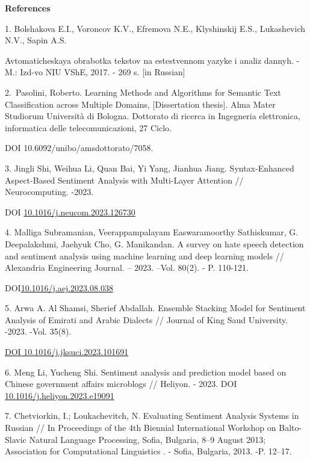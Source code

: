 \begin{center}
{\bfseries References}
\end{center}

\begin{references}
1. Bolshakova E.I., Voroncov K.V., Efremova N.E., Klyshinskij E.S.,
Lukashevich N.V., Sapin A.S. 

Avtomaticheskaya obrabotka tekstov na
estestvennom yazyke i analiz dannyh. - M.: Izd-vo NIU VShE, 2017. - 269
s. {[}in Russian{]}

2.~Pasolini, Roberto. Learning Methods and Algorithms for Semantic Text
Classification across Multiple Domains, {[}Dissertation thesis{]}. Alma
Mater Studiorum Università di Bologna. Dottorato di ricerca in
Ingegneria elettronica, informatica delle telecomunicazioni, 27 Ciclo.

DOI 10.6092/unibo/amsdottorato/7058.

3. Jingli Shi, Weihua Li, Quan Bai, Yi Yang, Jianhua Jiang.
Syntax-Enhanced Aspect-Based Sentiment Analysis with Multi-Layer
Attention // Neurocomputing. -2023.

DOI
\href{https://doi.org/10.1016/j.neucom.2023.126730}{10.1016/j.neucom.2023.126730}

4. Malliga Subramanian, Veerappampalayam Easwaramoorthy Sathiskumar, G.
Deepalakshmi, Jaehyuk Cho, G. Manikandan. A survey on hate speech
detection and sentiment analysis using machine learning and deep
learning models // Alexandria Engineering Journal. -- 2023. --Vol.
80(2). - P. 110-121.

DOI\href{http://dx.doi.org/10.1016/j.aej.2023.08.038}{10.1016/j.aej.2023.08.038}

5. Arwa A. Al Shamsi, Sherief Abdallah. Ensemble Stacking Model for
Sentiment Analysis of Emirati and Arabic Dialects // Journal of King
Saud University. -2023. -Vol. 35(8).

\href{https://doi.org/10.1016/j.jksuci.2023.101691}{DOI
10.1016/j.jksuci.2023.101691}

6. Meng Li, Yucheng Shi. Sentiment analysis and prediction model based
on Chinese government affairs microblogs // Heliyon. - 2023. DOI
\href{https://doi.org/10.1016/j.heliyon.2023.e19091}{10.1016/j.heliyon.2023.e19091}

7. Chetviorkin, I.; Loukachevitch, N. Evaluating Sentiment Analysis
Systems in Russian // In Proceedings of the 4th Biennial International
Workshop on Balto-Slavic Natural Language Processing, Sofia, Bulgaria,
8--9 August 2013; Association for Computational Linguistics . - Sofia,
Bulgaria, 2013. -P. 12--17.


\end{references}

